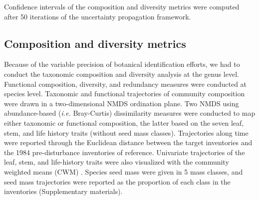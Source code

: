 \documentclass[fleqn,10pt]{ArtEcoFoG} %
\begin{document}
\color{red}Confidence intervals of the composition and diversity metrics were computed after 50 iterations of the uncertainty propagation framework.\color{black}

\hypertarget{composition-and-diversity-metrics}{%
\subsection{Composition and diversity metrics}\label{composition-and-diversity-metrics}}

Because of the variable precision of botanical identification efforts, we had to conduct the taxonomic composition and diversity analysis at the genus level.
\color{red}Functional composition, diversity, and redundancy measures were conducted at species level.\color{black}
Taxonomic and functional trajectories of community composition were drawn in a two-dimensional NMDS ordination plane.
Two NMDS using abundance-based (\emph{i.e.} Bray-Curtis) dissimilarity measures were conducted to map either taxonomic or functional composition, the latter based on the seven leaf, stem, and life history traits (without seed mass classes).
Trajectories along time were reported through the Euclidean distance between the target inventories and the 1984 pre-disturbance inventories of reference.
Univariate trajectories of the leaf, stem, and life-history traits were also visualized with the community weighted means (CWM) \citep{Diaz2007}.
Species seed mass were given in 5 mass classes, and seed mass trajectories were reported as the proportion of each class in the inventories (Supplementary materials).
\end{document}
